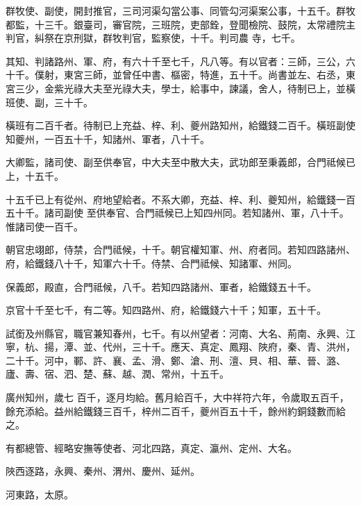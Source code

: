 \begin{pinyinscope}
 群牧使、副使，開封推官，三司河渠勾當公事、同管勾河渠案公事，十五千。群牧都監，十三千。銀臺司，審官院，三班院，吏部銓，登聞檢院、鼓院，太常禮院主判官，糾祭在京刑獄，群牧判官，監察使，十千。判司農
 寺，七千。



 其知、判諸路州、軍、府，有六十千至七千，凡八等。有以官者：三師，三公，六十千。僕射，東宮三師，並曾任中書、樞密，特進，五十千。尚書並左、右丞，東宮三少，金紫光祿大夫至光祿大夫，學士，給事中，諫議，舍人，待制已上，並橫班使、副，三十千。



 橫班有二百千者。待制已上充益、梓、利、夔州路知州，給鐵錢二百千。橫班副使知夔州，一百五十千，知諸州、軍者，八十千。



 大卿監，諸司使、副至供奉官，中大夫至中散大夫，武功郎至秉義郎，合門祗候已上，十五千。



 十五千已上有從州、府地望給者。不系大卿，充益、梓、利、夔知州，給鐵錢一百五十千。諸司副使
 至供奉官、合門祗候已上知四州同。若知諸州、軍，八十千。惟諸司使一百千。



 朝官忠翊郎，侍禁，合門祗候，十千。朝官權知軍、州、府者同。若知四路諸州、府，給鐵錢八十千，知軍六十千。侍禁、合門祗候、知諸軍、州同。



 保義郎，殿直，合門祗候，八千。若知四路諸州、軍者，給鐵錢五十千。



 京官十千至七千，有二等。知四路州、府，給鐵錢六十千；知軍，五十千。



 試銜及州縣官，職官兼知春州，七千。有以州望者：河南、大名、荊南、永興、江寧，杭、揚，潭、並、代州，三十千。應天、真定、鳳翔、陜府，秦、青、洪州，二十千。河中，鄆、許、襄、孟、滑、鄭、滄、刑、澶、貝、相、華、晉、潞、廬、壽、宿、泗、楚、蘇、越、潤、常州，十五千。



 廣州知州，歲七
 百千，逐月均給。舊月給百千，大中祥符六年，令歲取五百千，餘充添給。益州給鐵錢三百千，梓州二百千，夔州百五十千，餘州約銅錢數而給之。



 有都總管、經略安撫等使者、河北四路，真定、瀛州、定州、大名。



 陜西逐路，永興、秦州、渭州、慶州、延州。



 河東路，太原。




\end{pinyinscope}
